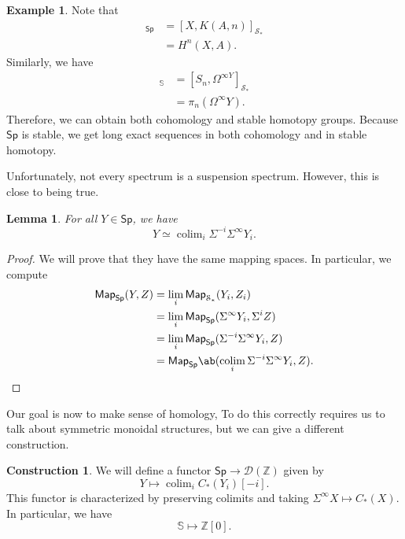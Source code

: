 \documentclass[10pt]{amsart}
\newtheorem{lem}[thm]{Lemma}
\theoremstyle{definition}
\newtheorem{con}[thm]{Construction}
\newtheorem{exm}[thm]{Example}
\theoremstyle{remark}
\theoremstyle{plain}
\theoremstyle{definition}
\theoremstyle{remark}
\newcommand{\Z}{\mathbb{Z}}
\newcommand{\bS}{\mathbb{S}}
\newcommand{\mc}[1]{\mathcal{#1}}
\newcommand{\ms}[1]{\mathsf{#1}}
\newcommand{\1}{\mathbf{1}}
\newcommand{\2}{\mathbf{2}}
\newcommand{\3}{\mathbf{3}}
\DeclareMathOperator*{\colim}{colim}
\begin{document}
\begin{exm}
    Note that
    \begin{align*}
        [\Sigma^{\infty} X, \Sigma^n HA]_{\ms{Sp}} &= [X, K(A, n)]_{\mc{S}_*} \\
        &= H^n(X, A).
    \end{align*}
    Similarly, we have
    \begin{align*}
        [\Sigma^n \bS, Y]_{\bS} &= [S_n, \Omega^{\infty Y}]_{\mc{S}_*} \\
        &= \pi_n (\Omega^{\infty} Y).
    \end{align*}
    Therefore, we can obtain both cohomology and stable homotopy groups. Because $\ms{Sp}$ is stable, we get long exact sequences in both cohomology and in stable homotopy.
\end{exm}

Unfortunately, not every spectrum is a suspension spectrum. However, this is close to being true.
\begin{lem}
    For all $Y \in \ms{Sp}$, we have
    \[ Y \simeq \colim_i \Sigma^{-i} \Sigma^{\infty} Y_i. \]
\end{lem}

\begin{proof}
    We will prove that they have the same mapping spaces. In particular, we compute
    \begin{align*}
        \ms{Map}_{\ms{Sp}}(Y, Z) &= \lim_i \ms{Map}_{\mc{S}_*}(Y_i, Z_i) \\
        &= \lim_i \ms{Map}_{\ms{Sp}} (\Sigma^{\infty} Y_i, \Sigma^i Z) \\
        &= \lim_i \ms{Map}_{\ms{Sp}} (\Sigma^{-i} \Sigma^{\infty} Y_i, Z) \\
        &= \ms{Map}_{\ms{Sp}} \ab(\colim_i \Sigma^{-i}\Sigma^{\infty} Y_i, Z).
    \end{align*}
\end{proof}

Our goal is now to make sense of homology, To do this correctly requires us to talk about symmetric monoidal structures, but we can give a different construction.

\begin{con}
    We will define a functor $\ms{Sp} \to \mc{D}(\Z)$ given by
    \[ Y \mapsto \colim_i C_*(Y_i) [-i]. \]
    This functor is characterized by preserving colimits and taking $\Sigma^{\infty} X \mapsto C_*(X)$. In particular, we have
    \[ \bS \mapsto \Z[0]. \]
\end{con}
\end{document}
